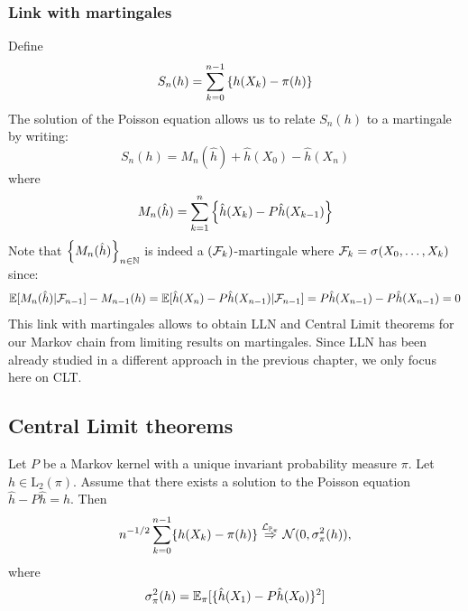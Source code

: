 \documentclass[english,graybox,envcountchap,envcountsame,sectrefs,shortlabels]{svmono}
\theoremstyle{style}
\newcommand{\ltwo}{\mathrm{L}_2}
\newcommand{\dlim}[1]{\stackrel{\mathcal{L}_{#1}}{\Rightarrow}}
\newcommand{\gauss}{\mathcal{N}}
\newcommand{\eqsp}{}
\begin{document}
\subsubsection{Link with martingales}

Define
$$
S_n(h)=\sum_{k=0}^{n-1} \left\{ h(X_k)-\pi(h)\right\}
$$
The solution of the Poisson equation allows us to relate $S_n(h)$ to a martingale by writing:
\begin{equation}\label{eq:decomp:marting}
S_n(h)=M_n(\hat h)+\hat h(X_0)-\hat h(X_n)
\end{equation}
where
\begin{equation}\label{eq:def:marting}
M_n(\hat h)=\sum_{k=1}^n \left\{ \hat h(X_k)-P\hat h(X_{k-1})\right\}
\end{equation}
Note that $\left\{ M_n(\hat h)\right\}_{n\in\mathbb{N}}$ is indeed a $(\mathcal{F}_k)$-martingale where $\mathcal{F}_k=\sigma(X_0,\ldots,X_k)$ since:
$$
\mathbb{E}[M_n(\hat h)|\mathcal{F}_{n-1}]-M_{n-1}(h)=\mathbb{E}[\hat h(X_n)-P\hat h(X_{n-1})|\mathcal{F}_{n-1}]=P\hat h(X_{n-1})-P\hat h(X_{n-1})=0
$$
This link with martingales allows to obtain LLN and Central Limit theorems for our Markov chain from limiting results on martingales. Since LLN has been already studied in a different approach in the previous chapter, we only focus here on CLT.


\subsection{Central Limit theorems}

 \begin{theorem}
  \label{thm:clt-poisson} 
  Let $P$ be a  Markov kernel with a unique invariant probability measure $\pi$. Let
  $h \in \ltwo(\pi)$. Assume that there exists a solution
  \fbox{$\hat{h} \in \ltwo(\pi)$} to the Poisson equation $\hat{h} - P \hat{h} = h$. Then
  \begin{align*}
    n^{-1/2} \sum_{k=0}^{n-1} \{h(X_k)-\pi(h)\} \dlim{\PP_\pi} \gauss(0,\sigma_\pi^2(h)) \eqsp ,
  \end{align*}
  where
  \begin{equation}
  \label{eq:equality-variance}
  \sigma_\pi^2(h) = \PE_\pi[ \{\hat{h}(X_1)-P\hat{h}(X_0)\}^2] %
  \end{equation}
\end{theorem}
\end{document}
